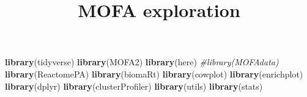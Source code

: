 \documentclass[
]{article}
\title{MOFA exploration}
\author{}
\date{\vspace{-2.5em}}
\newenvironment{Shaded}{\begin{snugshade}}{\end{snugshade}}
\newcommand{\CommentTok}[1]{\textcolor[rgb]{0.56,0.35,0.01}{\textit{#1}}}
\newcommand{\KeywordTok}[1]{\textcolor[rgb]{0.13,0.29,0.53}{\textbf{#1}}}
\newcommand{\NormalTok}[1]{#1}
\begin{document}
\maketitle

\begin{Shaded}
\begin{Highlighting}[]
\KeywordTok{library}\NormalTok{(tidyverse)}
\KeywordTok{library}\NormalTok{(MOFA2)}
\KeywordTok{library}\NormalTok{(here)}
\CommentTok{#library(MOFAdata)}
\KeywordTok{library}\NormalTok{(ReactomePA)}
\KeywordTok{library}\NormalTok{(biomaRt)}
\KeywordTok{library}\NormalTok{(cowplot)}
\KeywordTok{library}\NormalTok{(enrichplot)}
\KeywordTok{library}\NormalTok{(dplyr)}
\KeywordTok{library}\NormalTok{(clusterProfiler)}
\KeywordTok{library}\NormalTok{(utils)}
\KeywordTok{library}\NormalTok{(stats)}
\end{Highlighting}
\end{Shaded}
\end{document}
